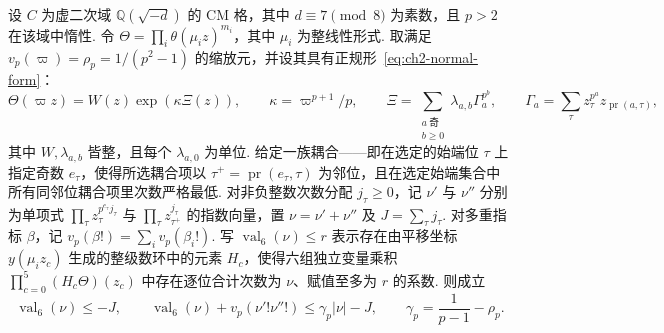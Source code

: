 \begin{lemma}
\label{lem:c-derivative-six-coupling}
\emitthmsource
设 $C$ 为虚二次域 $\mathbb Q(\sqrt{-d})$ 的 CM 格，其中 $d\equiv7\pmod8$ 为素数，且 $p>2$ 在该域中惰性. 令 $\Theta=\prod_i\theta(\mu_i z)^{m_i}$，其中 $\mu_i$ 为整线性形式. 取满足 $v_p(\varpi)=\rho_p=1/(p^2-1)$ 的缩放元，并设其具有正规形~\eqref{eq:ch2-normal-form}：
\[
 \Theta(\varpi z)=W(z)\exp(\kappa\Xi(z)),\qquad
 \kappa=\varpi^{p+1}/p,\qquad
 \Xi=\sum_{\substack{a\ \text{奇}\\ b\ge0}}\lambda_{a,b}\Gamma_a^{p^b},
 \qquad
 \Gamma_a=\sum_\tau z_\tau^{p^a}z_{\operatorname{pr}(a,\tau)},
\]
其中 $W,\lambda_{a,b}$ 皆整，且每个 $\lambda_{a,0}$ 为单位. 给定一族耦合——即在选定的始端位 $\tau$ 上指定奇数 $e_\tau$，使得所选耦合项以 $\tau^+=\operatorname{pr}(e_\tau,\tau)$ 为邻位，且在选定始端集合中所有同邻位耦合项里次数严格最低. 对非负整数次数分配 $j_\tau\ge0$，记 $\nu'$ 与 $\nu''$ 分别为单项式 $\prod_\tau z_\tau^{p^{e_\tau}j_\tau}$ 与 $\prod_\tau z_{\tau^+}^{j_\tau}$ 的指数向量，置 $\nu=\nu'+\nu''$ 及 $J=\sum_\tau j_\tau$. 对多重指标 $\beta$，记 $v_p(\beta!)=\sum_i v_p(\beta_i!)$. 写 $\operatorname{val}_6(\nu)\le r$ 表示存在由平移坐标 $y(\mu_i z_c)$ 生成的整级数环中的元素 $H_c$，使得六组独立变量乘积 $\prod_{c=0}^5(H_c\Theta)(z_c)$ 中存在逐位合计次数为 $\nu$、赋值至多为 $r$ 的系数. 则成立
\[
 \operatorname{val}_6(\nu)\le -J,\qquad
 \operatorname{val}_6(\nu)+v_p(\nu'!\nu''!)\le\gamma_p|\nu|-J,
 \qquad \gamma_p=\frac1{p-1}-\rho_p.
\]
\end{lemma}

